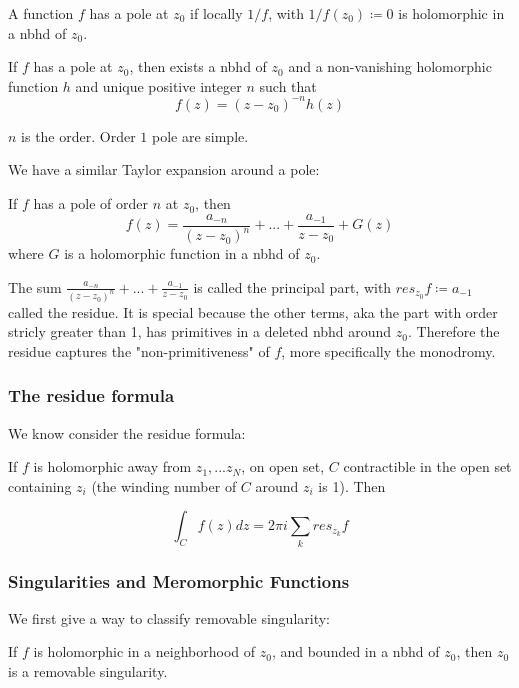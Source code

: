 \documentclass[main.tex]{subfiles}
\begin{document}
A function $f$ has a pole at $z_0$ if locally $1/f$, with $1/f(z_0) \coloneqq 0$ is holomorphic in a nbhd of $z_0$.

\begin{theorem}
If $f$ has a pole at $z_0$, then exists a nbhd of $z_0$ and a non-vanishing holomorphic function $h$ and unique positive integer $n$ such that 
$$
f(z) = (z-z_0)^{-n} h(z)
$$
\end{theorem}
$n$ is the order. Order $1$ pole are simple.

We have a similar Taylor expansion around a pole:

\begin{theorem}
If $f$ has a pole of order $n$ at $z_0$, then
$$
f(z) = \frac{a_{-n}}{(z-z_0)^n} + ... + \frac{a_{-1}}{z-z_0} + G(z)
$$
where $G$ is a holomorphic function in a nbhd of $z_0$.
\end{theorem}
The sum $\frac{a_{-n}}{(z-z_0)^n} + ... + \frac{a_{-1}}{z-z_0}$ is called the principal part, with $res_{z_0} f \coloneqq a_{-1}$ called the residue. It is special because the other terms, aka the part with order stricly greater than 1, has primitives in a deleted nbhd around $z_0$. Therefore the residue captures the "non-primitiveness" of $f$, more specifically the monodromy.

\subsubsection{The residue formula}
We know consider the residue formula:

\begin{theorem}
If $f$ is holomorphic away from $z_1, ... z_N$, on open set, $C$ contractible in the open set containing $z_i$ (the winding number of $C$ around $z_i$ is 1). Then 

$$
\int_C f(z) dz = 2\pi i \sum_k res_{z_k} f
$$
\end{theorem}

\subsubsection{Singularities and Meromorphic Functions}

We first give a way to classify removable singularity:

\begin{theorem}
If $f$ is holomorphic in a neighborhood of $z_0$, and bounded in a nbhd of $z_0$, then $z_0$ is a removable singularity. 
\end{theorem}
\end{document}
